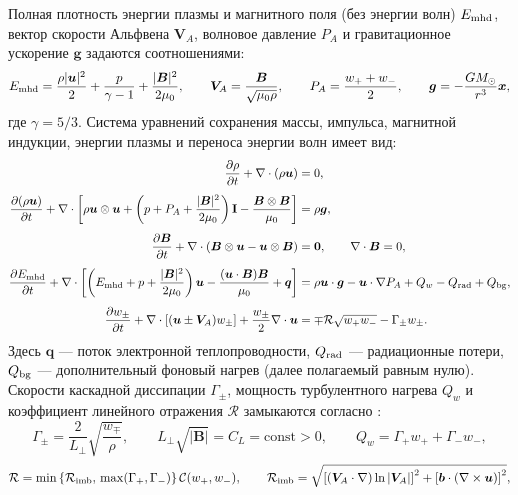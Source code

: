 \documentclass[11pt,a4paper]{article}
\begin{document}
Полная плотность энергии плазмы и магнитного поля (без энергии волн) $E_{\rm mhd}$, вектор скорости Альфвена $\bm{V}_A$, волновое давление $P_A$ и гравитационное ускорение $\bm{g}$ задаются соотношениями:
\begin{equation}
E_{\rm mhd} = \frac{\rho|\bm{u}|^2}{2} + \frac{p}{\gamma-1} + \frac{|\bm{B}|^2}{2\mu_0}, \qquad
\bm{V}_A = \frac{\bm{B}}{\sqrt{\mu_0\rho}}, \qquad
P_A = \frac{w_+ + w_-}{2}, \qquad
\bm{g} = -\frac{GM_\odot}{r^3}\bm{x},
\label{eq:defs_3d}
\end{equation}
где $\gamma = 5/3$. Система уравнений сохранения массы, импульса, магнитной индукции, энергии плазмы и переноса энергии волн имеет вид:
\begin{align}
\frac{\partial\rho}{\partial t} + \nabla\cdot(\rho\bm{u}) &= 0,
\label{eq:3d_mass}\\[4pt]
\frac{\partial(\rho\bm{u})}{\partial t} + \nabla\cdot\left[\rho\bm{u}\otimes\bm{u} + \left(p + P_A + \frac{|\bm{B}|^2}{2\mu_0}\right)\mathbf{I} - \frac{\bm{B}\otimes\bm{B}}{\mu_0}\right] &= \rho\bm{g},
\label{eq:3d_momentum}\\[4pt]
\frac{\partial\bm{B}}{\partial t} + \nabla\cdot(\bm{B}\otimes\bm{u} - \bm{u}\otimes\bm{B}) &= \bm{0}, \qquad \nabla\cdot\bm{B} = 0,
\label{eq:3d_induction}\\[4pt]
\frac{\partial E_{\rm mhd}}{\partial t} + \nabla\cdot\left[\left(E_{\rm mhd} + p + \frac{|\bm{B}|^2}{2\mu_0}\right)\bm{u} - \frac{(\bm{u}\cdot\bm{B})\bm{B}}{\mu_0} + \bm{q}\right] &= \rho\bm{u}\cdot\bm{g} - \bm{u}\cdot\nabla P_A + Q_w - Q_{\rm rad} + Q_{\rm bg},
\label{eq:3d_energy}\\[4pt]
\frac{\partial w_\pm}{\partial t} + \nabla\cdot\left[(\bm{u} \pm \bm{V}_A)w_\pm\right] + \frac{w_\pm}{2}\nabla\cdot\bm{u} &= \mp\mathcal{R}\sqrt{w_+ w_-} - \Gamma_\pm w_\pm.
\label{eq:3d_waves}
\end{align}
Здесь $\bm{q}$ --- поток электронной теплопроводности, $Q_{\rm rad}$ --- радиационные потери, $Q_{\rm bg}$ --- дополнительный фоновый нагрев (далее полагаемый равным нулю). Скорости каскадной диссипации $\Gamma_\pm$, мощность турбулентного нагрева $Q_w$ и коэффициент линейного отражения $\mathcal{R}$ замыкаются согласно \cite{vanderHolst2014}:
\begin{equation}
\Gamma_\pm = \frac{2}{L_\perp}\sqrt{\frac{w_\mp}{\rho}}, \qquad
L_\perp\sqrt{|\bm{B}|} = C_L = \mathrm{const} > 0, \qquad
Q_w = \Gamma_+ w_+ + \Gamma_- w_-,
\label{eq:3d_dissipation}
\end{equation}
\begin{equation}
\mathcal{R} = \min\left\{\mathcal{R}_{\rm imb},\, \max(\Gamma_+,\Gamma_-)\right\}\mathcal{C}(w_+, w_-), \qquad
\mathcal{R}_{\rm imb} = \sqrt{\left[(\bm{V}_A\cdot\nabla)\ln|\bm{V}_A|\right]^2 + \left[\bm{b}\cdot(\nabla\times\bm{u})\right]^2},
\label{eq:3d_reflection}
\end{equation}
\end{document}
